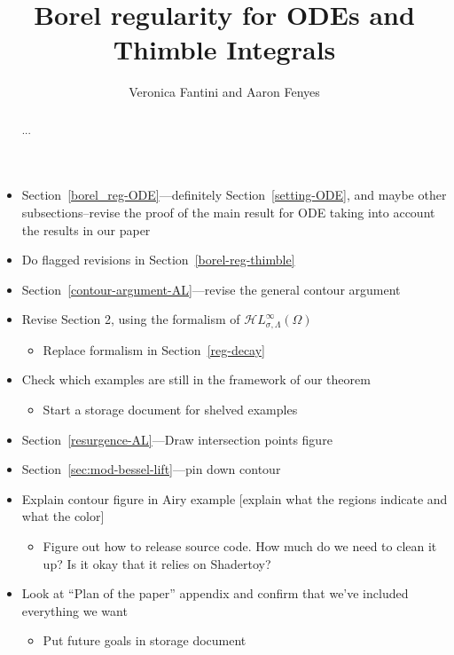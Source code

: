 \documentclass{article}
\title{Borel regularity for ODEs and Thimble Integrals}
\author{Veronica Fantini and Aaron Fenyes}
\newcommand{\singexp}[2]{\mathcal{H}L^\infty_{#1, #2}}
\theoremstyle{definition}
\newenvironment{brainstorm}{\color{violet}\begin{itemize}}{\end{itemize}\color{black}}
\begin{document}
\maketitle

\begin{abstract}
    ...
\end{abstract}
\tableofcontents

\begin{brainstorm}
    \item Section~\ref{borel_reg-ODE}---definitely Section~\ref{setting-ODE}, and maybe other subsections--revise the proof of the main result for ODE taking into account the results in our paper
    \item Do flagged revisions in Section~\ref{borel-reg-thimble}
    \item Section~\ref{contour-argument-AL}---revise the general contour argument
    \item Revise Section 2, using the formalism of $\singexp{\sigma}{\Lambda}(\Omega)$
    \begin{itemize}
    \item Replace formalism in Section~\ref{reg-decay}
    \end{itemize}
    \item Check which examples are still in the framework of our theorem
    \begin{itemize}
    \item Start a storage document for shelved examples
    \end{itemize}
    \item Section~\ref{resurgence-AL}---Draw intersection points figure
    \item Section~\ref{sec:mod-bessel-lift}---pin down contour
    \item Explain contour figure in Airy example [explain what the regions indicate and what the color]
    \begin{itemize}
    \item Figure out how to release source code. How much do we need to clean it up? Is it okay that it relies on Shadertoy?
    \end{itemize}
    \item Look at ``Plan of the paper'' appendix and confirm that we've included everything we want
    \begin{itemize}
    \item Put future goals in storage document
    \end{itemize}
\end{brainstorm}
\end{document}
